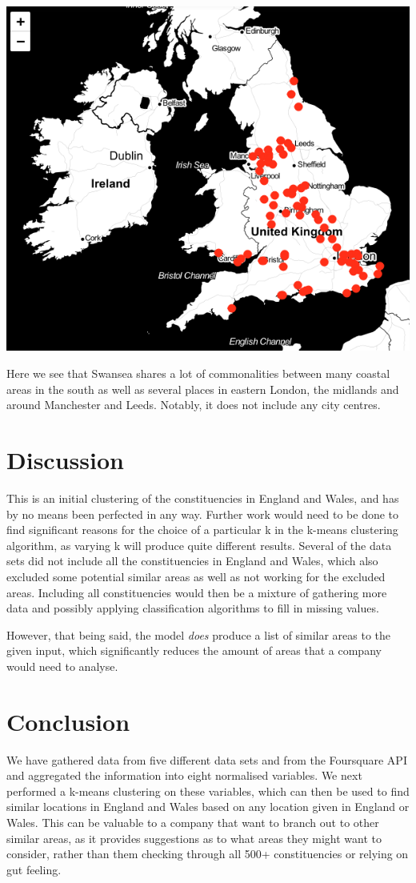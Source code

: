 \documentclass[a4paper, 11pt]{article}
\begin{document}
\begin{center}
  \includegraphics[scale=.40]{../gfx/map1.png}
\end{center}

Here we see that Swansea shares a lot of commonalities between many coastal areas in the south as well as several places in eastern London, the midlands and around Manchester and Leeds. Notably, it does not include any city centres.


\section{Discussion}
This is an initial clustering of the constituencies in England and Wales, and has by no means been perfected in any way. Further work would need to be done to find significant reasons for the choice of a particular k in the k-means clustering algorithm, as varying k will produce quite different results. Several of the data sets did not include all the constituencies in England and Wales, which also excluded some potential similar areas as well as not working for the excluded areas. Including all constituencies would then be a mixture of gathering more data and possibly applying classification algorithms to fill in missing values.

However, that being said, the model \textit{does} produce a list of similar areas to the given input, which significantly reduces the amount of areas that a company would need to analyse.


\section{Conclusion}
We have gathered data from five different data sets and from the Foursquare API and aggregated the information into eight normalised variables. We next performed a k-means clustering on these variables, which can then be used to find similar locations in England and Wales based on any location given in England or Wales. This can be valuable to a company that want to branch out to other similar areas, as it provides suggestions as to what areas they might want to consider, rather than them checking through all 500+ constituencies or relying on gut feeling. 
\end{document}
